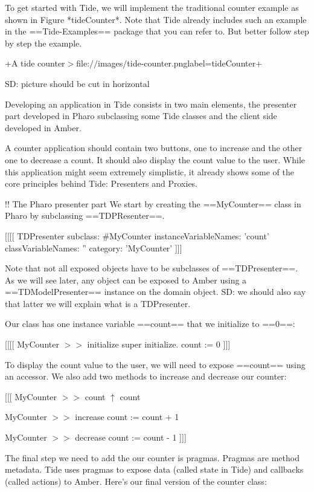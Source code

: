 \documentclass[a4paper,10pt,twoside]{book}
\begin{document}
\begin{todo}
{To get started with Tide, we will implement the traditional counter example as shown in Figure *tideCounter*. 
Note that Tide already includes such an example in the ==Tide-Examples== package that you can refer to.
But better follow step by step the example.

+A tide counter$>$file:$/$$/$images$/$tide-counter.png\textbar{}label=tideCounter+

SD: picture should be cut in horizontal

Developing an application in Tide consists in two main elements, the presenter part developed in Pharo subclassing some Tide classes
 and the client side developed in Amber. 

A counter application should contain two buttons, one to increase and the other one to decrease a count. It should also display the count value to the user. While this application might seem extremely simplistic, it already shows some of the 
core principles behind Tide: Presenters and Proxies.


!! The Pharo presenter part
We start by creating the ==MyCounter== class in Pharo by subclassing ==TDPResenter==.

{[}{[}{[}{[}
TDPresenter subclass: \#MyCounter
	instanceVariableNames: 'count'
	classVariableNames: ''
	category: 'MyCounter'
{]}{]}{]}

Note that not all exposed objects have to be subclasses of ==TDPresenter==. As we will
see later, any object can be exposed to Amber using a ==TDModelPresenter== instance
on the domain object. SD: we should also say that latter we will explain what is a TDPresenter.

Our class has one instance variable ==count== that we initialize to ==0==:

{[}{[}{[}{[}
MyCounter $>$$>$ initialize
    super initialize.
    count := 0
{]}{]}{]}

To display the count value to the user, we will need to expose ==count== using an accessor.
We also add two methods to increase and decrease our counter:

{[}{[}{[}
MyCounter $>$$>$ count
    $\uparrow$ count

MyCounter $>$$>$ increase
    count := count + 1

MyCounter $>$$>$ decrease
    count := count - 1
{]}{]}{]}

The final step we need to add the our counter is pragmas. Pragmas are 
method metadata. Tide uses pragmas to expose data (called state in Tide) 
and callbacks (called actions) to Amber. Here's our final version of the 
counter class:

}
\end{todo}
\end{document}
